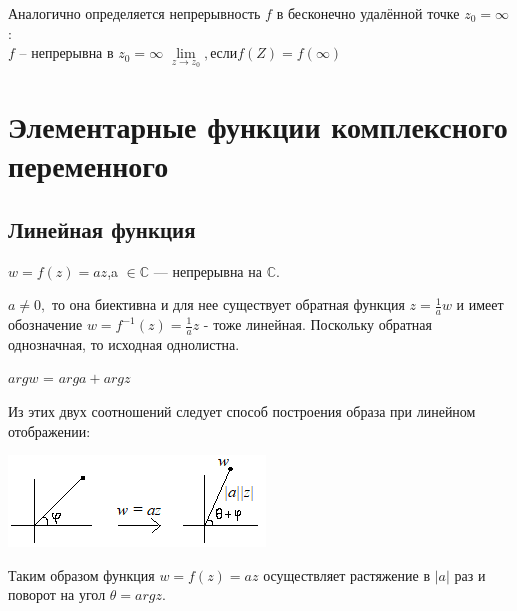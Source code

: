 \documentclass[a4paper, 12pt]{report}
\begin{document}
\par\bigskip
Аналогично определяется непрерывность $f$ в бесконечно удалённой точке $z_0 = \infty$:\\ $f$ -- непрерывна в $z_0 = \infty$ $\lim\limits_{z \to z_0},если f(Z) = f(\infty)$






\section{Элементарные функции комплексного переменного}

\subsection{Линейная функция} 
\hspace{1 mm}

$w = f(z) = az$,\quad a $\in \mathbb{C} $ --- непрерывна на $ \mathbb{C}$.  

\par{} $ a \neq 0,$ то она биективна и для нее существует обратная функция $z = \frac{1}{a}w$ и имеет обозначение $w = f^{-1}(z) = \frac{1}{a}z$ - тоже линейная. Поскольку обратная однозначная, то исходная однолистна.


\par $arg$\hspace{1 mm}$ w $ = $ arg$\hspace{1 mm}$ a + arg$\hspace{1 mm}$ z$
\bigskip

Из этих двух соотношений следует способ построения образа при линейном отображении:

\includegraphics{5-6/1io.png}

Таким образом функция $w = f(z) = az$ осуществляет растяжение в $\left\lvert a \right\rvert$ раз и поворот на угол $\theta = arg$\hspace{0.2 mm}$z$.
\end{document}
